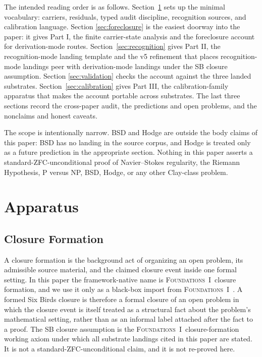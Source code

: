 \documentclass[11pt]{article}
\newcommand{\FOne}{\textsc{Foundations~I}}
\theoremstyle{definition}
\begin{document}
The intended reading order is as follows.  Section~\ref{sec:apparatus}
sets up the minimal vocabulary: carriers, residuals, typed audit
discipline, recognition sources, and calibration language.  Section
\ref{sec:foreclosure} is the easiest doorway into the paper: it gives
Part I, the finite carrier-state analysis and the foreclosure account
for derivation-mode routes.  Section~\ref{sec:recognition} gives
Part II, the recognition-mode landing template and the v5 refinement
that places recognition-mode landings peer with derivation-mode
landings under the SB closure assumption.  Section
\ref{sec:validation} checks the account against the three landed
substrates.  Section~\ref{sec:calibration} gives Part III, the
calibration-family apparatus that makes the account portable across
substrates.  The last three sections record the cross-paper audit,
the predictions and open problems, and the nonclaims and honest
caveats.

The scope is intentionally narrow.  BSD \cite{Wiles2000BSD} and Hodge
\cite{Deligne2000Hodge} are outside the body claims of this paper:
BSD has no landing in the source corpus, and Hodge is treated only as
a future prediction in the appropriate section.  Nothing in this paper asserts a standard-ZFC-unconditional
proof of Navier--Stokes regularity, the Riemann Hypothesis, P versus
NP, BSD, Hodge, or any other Clay-class problem.
 \section{Apparatus}\label{sec:apparatus}

\subsection{Closure Formation}\label{sec:apparatus:closure-formation}

A closure formation is the background act of organizing an open
problem, its admissible source material, and the claimed closure event
inside one formal setting.  In this paper the framework-native name is
\FOne\ closure formation, and we use it only as a black-box import from
\FOne\ \cite{Tsiokos2026EmergenceCalculus}.  A formed Six Birds
closure is therefore a formal closure of an open problem in which the
closure event is itself treated as a structural fact about the
problem's mathematical setting, rather than as an informal label
attached after the fact to a proof.  The SB closure assumption is the
\FOne\ closure-formation working axiom under which all substrate
landings cited in this paper are stated.  It is not a
standard-ZFC-unconditional claim, and it is not re-proved here.
\end{document}
